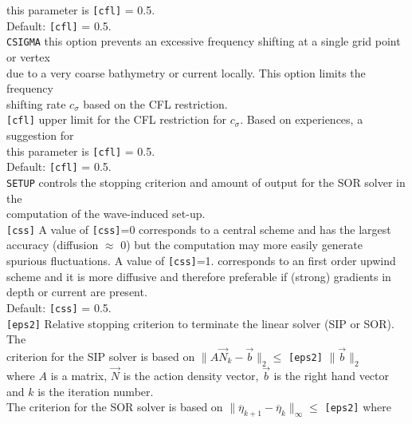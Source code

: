\documentclass[12pt]{book}
\begin{document}
\begin{tabbing}
                  this parameter is {\tt [cfl]} = 0.5.\\
                  Default: {\tt [cfl]} = 0.5.\-\\
{\tt CSIGMA}   \> this option prevents an excessive frequency shifting at a single grid point or vertex\+\\
                  due to a very coarse bathymetry or current locally. This option limits the frequency\\
                  shifting rate $c_{\sigma}$ based on the CFL restriction.\-\\
{\tt [cfl]}    \> upper limit for the CFL restriction for $c_{\sigma}$. Based on experiences, a suggestion for\+\\
                  this parameter is {\tt [cfl]} = 0.5.\\
                  Default: {\tt [cfl]} = 0.5.\-\\
{\tt SETUP}    \> controls the stopping criterion and amount of output for the SOR solver in the\+\\
                  computation of the wave-induced set-up.\-\\
{\tt [css]}    \> A value of {\tt [css]}=0 corresponds to a central scheme and has the largest\+\\
                  accuracy (diffusion $\approx$ 0) but the computation may more easily generate\\
                  spurious fluctuations. A value of {\tt [css]}=1. corresponds to an first order upwind\\
                  scheme and it is more diffusive and therefore preferable if (strong) gradients in\\
                  depth or current are present.\\
                  Default: {\tt [css]} = 0.5.\-\\
{\tt [eps2]}   \> Relative stopping criterion to terminate the linear solver (SIP or SOR). The\+\\
                  criterion for the SIP solver is based on
                  $\| A {\vec{N}}_k - \vec{b} \|_2 \leq$ {\tt [eps2]} $\| \vec{b} \|_2 $\\
                  where $A$ is a matrix, $\vec{N}$ is the action density vector, $\vec{b}$ is the right hand vector\\
                  and $k$ is the iteration number.\\
                  The criterion for the SOR solver is based on $\| {\overline{\eta}}_{k+1} - {\overline{\eta}}_{k} \|_{\infty} \leq$ {\tt [eps2]} where\\

\end{tabbing}
\end{document}
